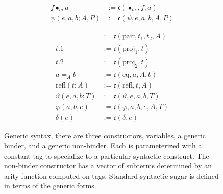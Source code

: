 \begin{figure}
\begin{minipage}{0.5\textwidth}
\begin{align*}
            f \bullet_m a &:= \mathfrak{c}(\bullet_m, f, a) \\
            \psi(e, a, b; A, P) &:= \mathfrak{c}(\psi, e, a, b, A, P)
        \end{align*}
    \end{minipage}%
    \begin{minipage}{0.5\textwidth}
        \begin{align*}
            [t_1, t_2; A] &:= \mathfrak{c}(\text{pair}, t_1, t_2, A) \\
            t.1 &:= \mathfrak{c}(\text{proj}_1, t) \\
            t.2 &:= \mathfrak{c}(\text{proj}_2, t) \\
            a =_{A} b &:= \mathfrak{c}(\text{eq}, a, A, b) \\
            \text{refl}(t; A) &:= \mathfrak{c}(\text{refl}, t, A) \\
            \vartheta(e, a, b; T) &:= \mathfrak{c}(\vartheta, e, a, b, T) \\
            \varphi(a, b, e) &:= \mathfrak{c}(\varphi, a, b, e, A, T) \\
            \delta(e) &:= \mathfrak{c}(\delta, e)
        \end{align*}
    \end{minipage}
    \caption{
        Generic syntax, there are three constructors, variables, a generic binder, and a generic non-binder.
        Each is parameterized with a constant tag to specialize to a particular syntactic construct.
        The non-binder constructor has a vector of subterms determined by an arity function computed on tags.
        Standard syntactic sugar is defined in terms of the generic forms.
    }
    \label{fig:syntax}
\end{figure}
